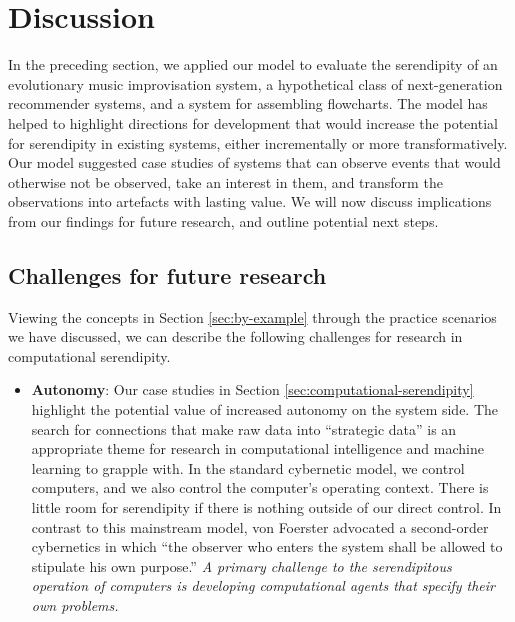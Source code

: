 
\section{Discussion} \label{sec:discussion}

In the preceding section, we applied our model to evaluate the serendipity of an evolutionary music improvisation system, a hypothetical class of next-generation recommender systems, and a system for assembling flowcharts.  The model has helped to highlight directions for development that would increase the potential for serendipity in existing systems, either incrementally or more transformatively.  Our model suggested case studies of systems that can observe events that would otherwise not be observed, take an interest in them, and transform the observations into artefacts with lasting value.  We will now discuss implications from our findings for future research, and outline potential next steps.

%
%
%

\subsection{Challenges for future research} \label{sec:recommendations}

Viewing the concepts in Section \ref{sec:by-example} through the
practice scenarios we have discussed, we can describe the following
challenges for research in computational serendipity.

\begin{itemize}
\item \textbf{Autonomy}: Our case studies in Section
  \ref{sec:computational-serendipity} highlight the potential value of
  increased autonomy on the system side.
The search for connections that make raw data into ``strategic data''
is an appropriate theme for research in computational intelligence and
machine learning to grapple with.  In the standard cybernetic model,
we control computers, and we also control the computer's operating
context.  There is little room for serendipity if there is nothing
outside of our direct control.  In contrast to this mainstream model,
von Foerster \citeyear[p. 286]{von2003cybernetics} advocated a
second-order cybernetics in which ``the observer who enters the system
shall be allowed to stipulate his own purpose.''  \emph{A
  primary challenge to the serendipitous operation of computers is
  developing computational agents that specify their own problems.}
\end{itemize}

